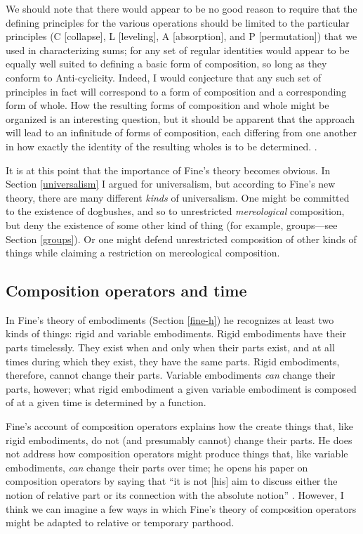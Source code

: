 \documentclass[12pt,twoside]{reedfancy}
\newenvironment{squote}{%
	\begin{spacing}{1}
	\begin{list}{}{%
	\setlength{\labelwidth}{0pt}%
	\rightmargin\leftmargin%
	}
	\item\relax
	}{%
	\end{list}%
	\end{spacing}
	}
\begin{document}
\begin{spacing}{1.25}
\begin{squote}
We should note that there would appear to be no good reason to require
that the defining principles for the various operations should be
limited to the particular principles (C [collapse], L [leveling], A
[absorption], and P [permutation]) that we used in characterizing
sums; for any set of regular identities would appear to be equally
well suited to defining a basic form of composition, so long as they
conform to Anti-cyclicity.  Indeed, I would conjecture that any such
set of principles in fact will correspond to a form of composition and
a corresponding form of whole.  How the resulting forms of composition
and whole might be organized is an interesting question, but it should
be apparent that the approach will lead to an infinitude of forms of
composition, each differing from one another in how exactly the
identity of the resulting wholes is to be
determined. \citep[575--576]{fine2010}.
\end{squote}

It is at this point that the importance of Fine's theory becomes
obvious.  In Section \ref{universalism} I argued for universalism, but
according to Fine's new theory, there are many different {\em kinds}
of universalism.  One might be committed to the existence of
dogbushes, and so to unrestricted {\em mereological} composition, but
deny the existence of some other kind of thing (for example,
groups---see Section \ref{groups}).  Or one might defend unrestricted
composition of other kinds of things while claiming a restriction on
mereological composition.

\subsection{Composition operators and time}
\label{c-change}
In Fine's theory of embodiments (Section \ref{fine-h}) he recognizes
at least two kinds of things: rigid and variable embodiments.  Rigid
embodiments have their parts timelessly.  They exist when and only
when their parts exist, and at all times during which they exist, they
have the same parts.  Rigid embodiments, therefore, cannot change
their parts.  Variable embodiments {\em can} change their parts,
however; what rigid embodiment a given variable embodiment is composed
of at a given time is determined by a function.

Fine's account of composition operators explains how the create things
that, like rigid embodiments, do not (and presumably cannot) change
their parts.  He does not address how composition operators might
produce things that, like variable embodiments, {\em can} change their
parts over time; he opens his paper on composition operators by saying
that ``it is not [his] aim to discuss either the notion of relative
part or its connection with the absolute notion''
\citeyearpar[559]{fine2010}.  However, I think we can imagine a few
ways in which Fine's theory of composition operators might be adapted
to relative or temporary parthood.


\end{spacing}
\end{document}
